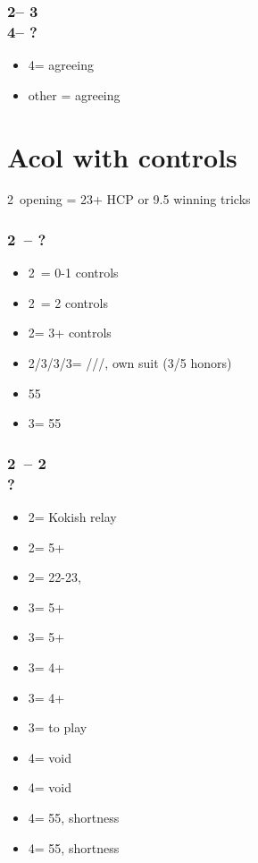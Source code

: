 \subsubsection*{2\spades -- 3\hearts\\
                4\clubs -- ?}
\begin{itemize}
    \item 4\diams = agreeing \diams
    \item other = agreeing \clubs
\end{itemize}

\section{\texorpdfstring{Acol with controls}{acolControls}}\label{sec:acolControls}

2\clubs\ opening = 23+ HCP or 9.5 winning tricks

\subsubsection*{2\clubs\ -- ?}
\begin{itemize}
    \item 2\diams\ = 0-1 controls
    \item 2\hearts\ = 2 controls
    \item 2\spades = 3+ controls
    \item 2\nt/3\clubs/3\diams/3\hearts = \clubs/\diams/\hearts/\spades, own suit (3/5 honors)
    \item 55\minor
    \item 3\nt = 55\major
\end{itemize}

\subsubsection*{2\clubs\ -- 2\diams\\?}
\begin{itemize}
    \item 2\hearts = Kokish relay
    \item 2\spades = 5+\spades
    \item 2\nt = 22-23, \bal
    \item 3\clubs = 5+\clubs
    \item 3\diams = 5+\diams
    \item 3\hearts = 4+\diams
    \item 3\spades = 4+\diams
    \item 3\nt = to play
    \item 4\clubs = \hearts void
    \item 4\diams = \spades void
    \item 4\hearts = 55\minor, \hearts shortness
    \item 4\spades = 55\minor, \spades shortness
\end{itemize}

